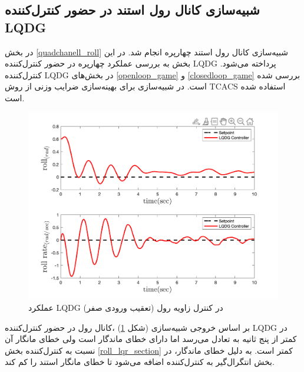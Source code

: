 \subsection{شبیه‌سازی کانال رول استند در حضور کنترل‌کننده LQDG}
در بخش
\ref{quadchanell_roll}
شبیه‌سازی کانال رول استند چهارپره انجام شد. در این بخش به بررسی عملکرد چهارپره در حضور کنترل‌کننده LQDG پرداخته می‌شود. کنترل‌کننده LQDG در بخش‌های
\ref{openloop_game}
و
\ref{closedloop_game}
بررسی شده است.
 در شبیه‌سازی برای بهینه‌سازی ضرایب وزنی از روش
TCACS \cite{Karimi2010}
استفاده شده است.
\begin{figure}[H]\label{lqdg_roll_fig}
	\includegraphics[width=12cm]{../Figures/MIL/LQDG/Roll/lqdg_roll.png}
	\centering
	\caption{عملكرد LQDG در کنترل زاويه رول (تعقیب ورودی صفر)}
\end{figure}
بر اساس خروجی شبیه‌سازی (شکل
\ref{lqdg_roll_fig})
،کانال رول در حضور کنترل‌کننده LQDG در کمتر از پنج ثانیه به تعادل می‌رسد اما دارای خطای ماندگار است ولی خطای مانگار آن نسبت به کنترل‌کننده بخش
\ref{roll_lqr_section}
کمتر است. به دلیل خطای ماندگار، در بخش
انتگرال‌گیر به کنترل‌کننده اضافه می‌شود تا خطای مانگار استند را کم کند.
